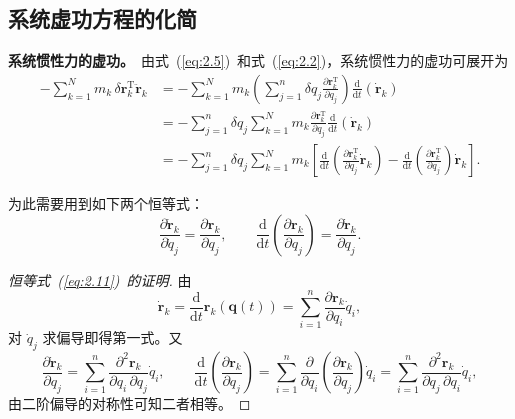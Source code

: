 \subsection{系统虚功方程的化简}

\textbf{系统惯性力的虚功。}~由式~(\ref{eq:2.5})~和式~(\ref{eq:2.2})，系统惯性力的虚功可展开为
\begin{equation}\label{eq:2.10}
\begin{aligned}
-\sum_{k=1}^{N} m_k \,\delta\boldsymbol{r}_k^{\mathrm{T}} \ddot{\boldsymbol{r}}_k
&= -\sum_{k=1}^{N} m_k \!\left(\sum_{j=1}^{n} \delta q_j \frac{\partial \boldsymbol{r}_k^{\mathrm{T}}}{\partial q_j}\right) \frac{\mathrm{d}}{\mathrm{d}t}(\dot{\boldsymbol{r}}_k) \\
&= -\sum_{j=1}^{n} \delta q_j \sum_{k=1}^{N} m_k \frac{\partial \boldsymbol{r}_k^{\mathrm{T}}}{\partial q_j} \frac{\mathrm{d}}{\mathrm{d}t}(\dot{\boldsymbol{r}}_k) \\
&= -\sum_{j=1}^{n} \delta q_j \sum_{k=1}^{N} m_k \!\left[ \frac{\mathrm{d}}{\mathrm{d}t}\!\left(\frac{\partial \boldsymbol{r}_k^{\mathrm{T}}}{\partial q_j} \dot{\boldsymbol{r}}_k\right) - \frac{\mathrm{d}}{\mathrm{d}t}\!\left(\frac{\partial \boldsymbol{r}_k^{\mathrm{T}}}{\partial q_j}\right) \dot{\boldsymbol{r}}_k \right].
\end{aligned}
\end{equation}

为此需要用到如下两个恒等式：
\begin{equation}\label{eq:2.11}
\frac{\partial \dot{\boldsymbol{r}}_k}{\partial \dot{q}_j} = \frac{\partial \boldsymbol{r}_k}{\partial q_j}, \qquad
\frac{\mathrm{d}}{\mathrm{d}t}\!\left(\frac{\partial \boldsymbol{r}_k}{\partial q_j}\right) = \frac{\partial \dot{\boldsymbol{r}}_k}{\partial q_j}.
\end{equation}

\begin{proof}[恒等式~(\ref{eq:2.11})~的证明]
由
\begin{equation*}
\dot{\boldsymbol{r}}_k = \frac{\mathrm{d}}{\mathrm{d}t} \boldsymbol{r}_k(\boldsymbol{q}(t)) = \sum_{i=1}^{n} \frac{\partial \boldsymbol{r}_k}{\partial q_i} \dot{q}_i,
\end{equation*}
对 $\dot{q}_j$ 求偏导即得第一式。又
\begin{equation*}
\frac{\partial \dot{\boldsymbol{r}}_k}{\partial q_j} = \sum_{i=1}^{n} \frac{\partial^2 \boldsymbol{r}_k}{\partial q_i \,\partial q_j} \dot{q}_i, \qquad
\frac{\mathrm{d}}{\mathrm{d}t}\!\left(\frac{\partial \boldsymbol{r}_k}{\partial q_j}\right) = \sum_{i=1}^{n} \frac{\partial}{\partial q_i}\!\left(\frac{\partial \boldsymbol{r}_k}{\partial q_j}\right) \dot{q}_i = \sum_{i=1}^{n} \frac{\partial^2 \boldsymbol{r}_k}{\partial q_j \,\partial q_i} \dot{q}_i,
\end{equation*}
由二阶偏导的对称性可知二者相等。
\end{proof}

